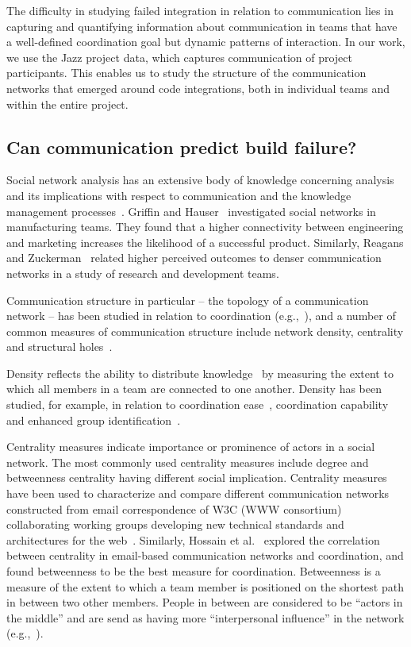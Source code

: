 The difficulty in studying failed integration in relation to communication lies
in capturing and quantifying information about communication in teams that have a
well-defined coordination goal but dynamic patterns of interaction. In our work,
we use the Jazz project data, which captures communication of project
participants. This enables us to study the structure of the communication
networks that emerged around code integrations, both in individual teams and within the entire project.

\subsection{Can communication predict build failure?}
\label{sec:ResearchQuestions}
Social network analysis has an extensive body of knowledge concerning analysis and its implications with respect to communication and the knowledge management
processes~\cite{Burt:1995vo,Freeman:1979rl}. Griffin and
Hauser~\cite{Griffin:1992ms} investigated social networks in manufacturing teams.
They found that a higher connectivity between engineering and marketing increases
the likelihood of a successful product. Similarly, Reagans and
Zuckerman~\cite{RayReagans:2001os} related higher perceived outcomes to denser
communication networks in a study of research and development teams.

Communication structure in particular -- the topology of a communication network
-- has been studied in relation to coordination
(e.g.,~\cite{hossain:cscw:2006,hinds:cscw:2006}), and a number of common measures of
communication structure include network density, centrality and structural
holes~\cite{Wasserman:1994sq,Freeman:1979rl}.

Density reflects the ability to distribute knowledge~\cite{Rulke:2000ys} by measuring the extent to which all members in a team are connected to one another. 
Density has been studied, for example, in relation
to coordination ease~\cite{hinds:cscw:2006}, coordination
capability~\cite{hossain:cscw:2006} and enhanced group
identification~\cite{RayReagans:2001os}.

Centrality measures indicate importance or prominence of actors in a
social network. The most commonly used centrality measures include degree and
betweenness centrality having different social implication. Centrality measures
have been used to characterize and compare different communication networks
constructed from email correspondence of W3C (WWW consortium) collaborating
working groups developing new technical standards and architectures for the
web~\cite{Gloor:2003cikm}. Similarly, Hossain et al.~\cite{hossain:cscw:2006}
explored the correlation between centrality in email-based communication networks
and coordination, and found betweenness to be the best measure for coordination.
Betweenness is a measure of the extent to which a team member is
positioned on the shortest path in between two other members. People in between
are considered to be ``actors in the middle'' and are send as having more ``interpersonal
influence'' in the
network (e.g.,~\cite{Gloor:2003cikm,zimmermann:icse:2008,hossain:cscw:2006}).

